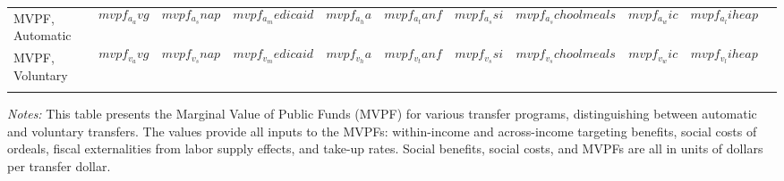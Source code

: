 \begin{table}[H]
\begin{tabular*}{1.36\textwidth}{@{\extracolsep{\fill}}lcccccccccc@{}}
  \addlinespace MVPF, Automatic     &  $$mvpf_a_avg$$                  & $$mvpf_a_snap$$ & $$mvpf_a_medicaid$$     & $$mvpf_a_ha$$              & $$mvpf_a_tanf$$ & $$mvpf_a_ssi$$ & $$mvpf_a_schoolmeals$$        & $$mvpf_a_wic$$ & $$mvpf_a_liheap$$   \\
  MVPF, Voluntary     & $$mvpf_v_avg$$                   & $$mvpf_v_snap$$   & $$mvpf_v_medicaid$$        & $$mvpf_v_ha$$                & $$mvpf_v_tanf$$   & $$mvpf_v_ssi$$   & $$mvpf_v_schoolmeals$$           & $$mvpf_v_wic$$  & $$mvpf_v_liheap$$    \\ \addlinespace  \bottomrule
  \end{tabular*}
  \begin{spacing}{1}
      \begin{tablenotes}
            \item \footnotesize \textit{Notes:} This table presents the Marginal Value of Public Funds (MVPF) for various transfer programs, distinguishing between automatic and voluntary transfers. The values provide all inputs to the MVPFs: within-income and across-income targeting benefits, social costs of ordeals, fiscal externalities from labor supply effects, and take-up rates. Social benefits, social costs, and MVPFs are all in units of dollars per transfer dollar.
            \end{tablenotes}
             \end{spacing}
            \end{table}
